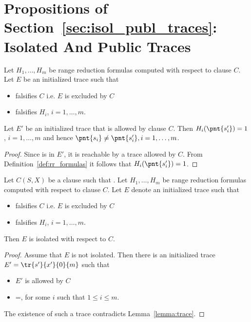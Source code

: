 \section*{Propositions of Section~\ref{sec:isol_publ_traces}: Isolated And Public Traces}
\begin{lemma}
\label{lemma:trace}
Let $H_1,\dots,H_m$ be range reduction formulas computed with respect
to clause $C$. Let $E$ be an initialized trace 
such that 
\begin{itemize}
\item {} falsifies $C$ i.e. $E$ is excluded by $C$
\item {} falsifies $H_i$, $i=1,\dots,m$.
\end{itemize} 
  Let $E'$ be an initialized
trace  that is allowed by clause $C$.  Then
$H_i(\pnt{s'_i})=1$, $i=1,\dots,m$ and hence $\pnt{s_i} \neq
\pnt{s'_i}, i=1,\dots,m$.
\end{lemma}
\begin{proof}
Since  is in $E'$, it is reachable by a trace allowed by
$C$. From Definition~\ref{def:rr_formulas} it follows that
$H_i(\pnt{s'_i})=1$.
\end{proof}


\begin{proposition}
Let $C(S,X)$ be a clause such that . Let
$H_1,\dots,H_m$ be range reduction formulas computed with respect to
clause $C$. Let $E$ denote an initialized trace  such
that
\begin{itemize}
\item {} falsifies $C$ i.e. $E$ is excluded by $C$
\item {} falsifies $H_i$, $i=1,\dots,m$.
\end{itemize} 
 Then $E$ is isolated with respect to $C$.
\end{proposition}

\begin{proof}
Assume that $E$ is not isolated. 
Then there is an initialized  trace $E' =  \tr{s'}{x'}{0}{m}$ such that
\begin{itemize}
\item $E'$ is allowed by $C$
\item {}=, for some $i$ such that $1 \leq i \leq m$.
\end{itemize}
The existence of such a trace contradicts Lemma~\ref{lemma:trace}.
\end{proof}



